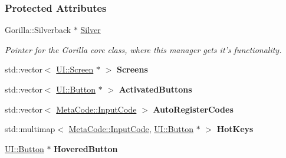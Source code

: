 \subsubsection*{Protected Attributes}
\begin{DoxyCompactItemize}
\item 
\hypertarget{classphys_1_1UIManager_ab4c5b8c7e3c4c7b03847b1af18bea02a}{
Gorilla::Silverback $\ast$ \hyperlink{classphys_1_1UIManager_ab4c5b8c7e3c4c7b03847b1af18bea02a}{Silver}}
\label{classphys_1_1UIManager_ab4c5b8c7e3c4c7b03847b1af18bea02a}

\begin{DoxyCompactList}\small\item\em Pointer for the Gorilla core class, where this manager gets it's functionality. \item\end{DoxyCompactList}\item 
\hypertarget{classphys_1_1UIManager_aebd9d3b20ad2822e227df77442240557}{
std::vector$<$ \hyperlink{classphys_1_1UI_1_1Screen}{UI::Screen} $\ast$ $>$ {\bfseries Screens}}
\label{classphys_1_1UIManager_aebd9d3b20ad2822e227df77442240557}

\item 
\hypertarget{classphys_1_1UIManager_a519fd2a2f1febb4c3d2a647a512c7581}{
std::vector$<$ \hyperlink{classphys_1_1UI_1_1Button}{UI::Button} $\ast$ $>$ {\bfseries ActivatedButtons}}
\label{classphys_1_1UIManager_a519fd2a2f1febb4c3d2a647a512c7581}

\item 
\hypertarget{classphys_1_1UIManager_affa048cc6e6930ba0f0b18fb4ee94c2e}{
std::vector$<$ \hyperlink{classphys_1_1MetaCode_a3e501cbb5bf0f6f1fdb7211465bda8d8}{MetaCode::InputCode} $>$ {\bfseries AutoRegisterCodes}}
\label{classphys_1_1UIManager_affa048cc6e6930ba0f0b18fb4ee94c2e}

\item 
\hypertarget{classphys_1_1UIManager_a6b43cf8529d403ff13d1ba342847d006}{
std::multimap$<$ \hyperlink{classphys_1_1MetaCode_a3e501cbb5bf0f6f1fdb7211465bda8d8}{MetaCode::InputCode}, \hyperlink{classphys_1_1UI_1_1Button}{UI::Button} $\ast$ $>$ {\bfseries HotKeys}}
\label{classphys_1_1UIManager_a6b43cf8529d403ff13d1ba342847d006}

\item 
\hypertarget{classphys_1_1UIManager_a37293b9d9ba8b05c9a03e4640a56c6c1}{
\hyperlink{classphys_1_1UI_1_1Button}{UI::Button} $\ast$ {\bfseries HoveredButton}}
\label{classphys_1_1UIManager_a37293b9d9ba8b05c9a03e4640a56c6c1}


\end{DoxyCompactItemize}
